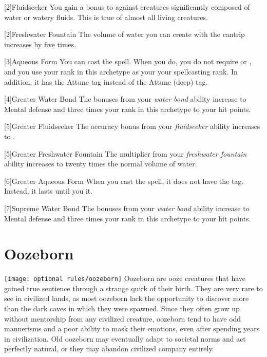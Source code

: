     [2]{Fluidseeker} You gain a  bonus to  against creatures significantly composed of water or watery fluids.
    This is true of almost all living creatures.

    [2]{Freshwater Fountain} The volume of water you can create with the  cantrip increases by five times.

    [3]{Aqueous Form} You can cast the  spell.
    When you do, you do not require  or , and you use your rank in this archetype as your your spellcasting rank.
    In addition, it has the Attune tag instead of the Attune (deep) tag.

    [4]{Greater Water Bond} The bonuses from your \textit{water bond} ability increase to  Mental defense and three times your rank in this archetype to your hit points.

    [5]{Greater Fluidseeker} The accuracy bonus from your \textit{fluidseeker} ability increases to .

    [5]{Greater Freshwater Fountain} The multiplier from your \textit{freshwater fountain} ability increases to twenty times the normal volume of water.

    [6]{Greater Aqueous Form} When you cast the  spell, it does not have the  tag.
    Instead, it lasts until you  it.

    [7]{Supreme Water Bond} The bonuses from your \textit{water bond} ability increase to  Mental defense and three times your rank in this archetype to your hit points.

\section{Oozeborn}
  \texttt{[image: optional rules/oozeborn]}
  Oozeborn are ooze creatures that have gained true sentience through a strange quirk of their birth.
  They are very rare to see in civilized lands, as most oozeborn lack the opportunity to discover more than the dark caves in which they were spawned.
  Since they often grow up without mentorship from any civilized creature, oozeborn tend to have odd mannerisms and a poor ability to mask their emotions, even after spending years in civilization.
  Old oozeborn may eventually adapt to societal norms and act perfectly natural, or they may abandon civilized company entirely.

